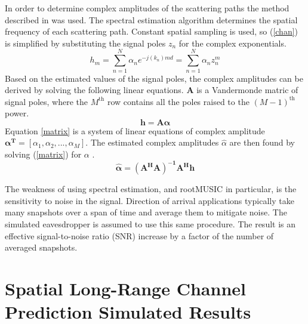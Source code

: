 \documentclass{allertonproc}
\begin{document}
In order to determine complex amplitudes of the scattering paths the method described in \cite{andersen1999} was used. The spectral estimation algorithm determines the spatial frequency of each scattering path. Constant spatial sampling is used, so (\ref{chan}) is simplified by substituting the signal poles $z_n$ for the complex exponentials.
\begin{equation}\label{complexamp}
h_m = \sum_{n=1}^N \alpha_n e^{-j(k_n)md} = \sum_{n=1}^N \alpha_n z_n^m
\end{equation}
Based on the estimated values of the signal poles, the complex amplitudes can be derived by solving the following linear equations. $\boldsymbol{A}$ is a Vandermonde matric of signal poles, where the $M^\mathrm{th}$ row contains all the poles raised to the $(M-1)^\mathrm{th}$ power. 
\begin{equation}\label{matrix}
\mathbf{h} = \mathbf{A \boldsymbol{\alpha}}
\end{equation}
Equation \ref{matrix} is a system of linear equations of complex amplitude $\boldsymbol{\alpha^T} = [\alpha_1, \alpha_2,... ,\alpha_M]$. The estimated complex amplitudes $\hat{\alpha}$ are then found by solving (\ref{matrix}) for $\alpha$ \cite{andersen1999}.
\begin{equation}\label{ahat}
\boldsymbol{\hat{\alpha}}=\boldsymbol{(A^HA)^{-1}A^Hh}
\end{equation}




The weakness of using spectral estimation, and rootMUSIC in particular, is the sensitivity to noise in the signal. Direction of arrival applications typically take many snapshots over a span of time and average them to mitigate noise. The simulated eavesdropper is assumed to use this same procedure. The result is an effective signal-to-noise ratio (SNR) increase by a factor of the number of averaged snapshots. 



\section{Spatial Long-Range Channel Prediction Simulated Results}\label{simresults}
\end{document}
